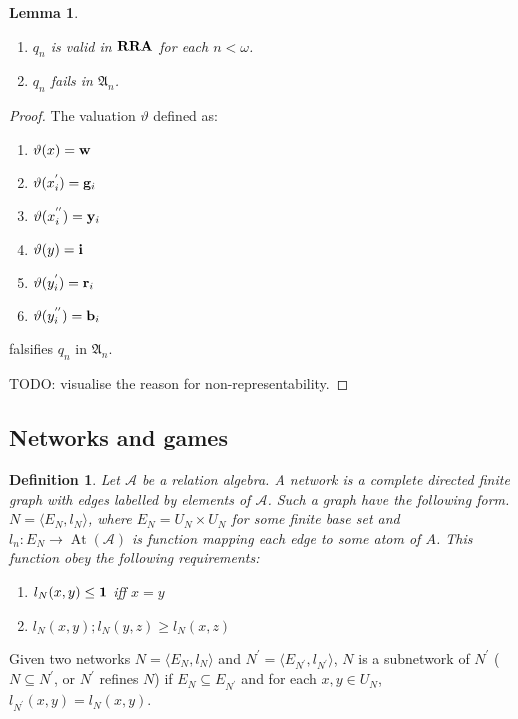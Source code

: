 \documentclass[a4paper]{article}
\theoremstyle{defin}
\newtheorem{defin}{Definition}
\theoremstyle{theorem}
\theoremstyle{prop}
\theoremstyle{lemma}
\newtheorem{lemma}{Lemma}
\theoremstyle{ex}
\theoremstyle{col}
\theoremstyle{claim}
\begin{document}
\begin{lemma}

  \begin{enumerate}
    \item $q_n$ is valid in ${\bf RRA}$ for each $n < \omega$.
    \item $q_n$ fails in $\mathfrak{A}_n$.
  \end{enumerate}
\end{lemma}

\begin{proof}
  The valuation $\vartheta$ defined as:
  \begin{enumerate}
    \item $\vartheta(x) = {\bf w}$
    \item $\vartheta(x_i^{'}) = {\bf g}_i$
    \item $\vartheta(x_i^{''}) = {\bf y}_i$
    \item $\vartheta(y) = {\bf i}$
    \item $\vartheta(y_i^{'}) = {\bf r}_i$
    \item $\vartheta(y_i^{''}) = {\bf b}_i$
  \end{enumerate}
  falsifies $q_n$ in $\mathfrak{A}_n$.

  TODO: visualise the reason for non-representability.
\end{proof}

\subsection{Networks and games}

\begin{defin}
  Let $\mathcal{A}$ be a relation algebra. A network is a complete directed finite graph with edges labelled by elements of $\mathcal{A}$. Such a graph have the following form. $N = \langle E_N, l_N \rangle$, where $E_N = U_N \times U_N$ for some finite base set and $l_n : E_N \to \operatorname{At}(\mathcal{A})$ is function mapping each edge to some atom of $A$. This function obey the following requirements:
  \begin{enumerate}
    \item $l_N(x,y) \leq {\bf 1}$ iff $x = y$
    \item $l_N(x, y) ; l_N(y,z) \geq l_N(x,z)$
  \end{enumerate}
\end{defin}
Given two networks $N = \langle E_N, l_N \rangle$ and $N^{'} = \langle E_{N^{'}}, l_{N^{'}} \rangle$, $N$ is a subnetwork of $N^{'}$ ($N \subseteq N^{'}$, or $N^{'}$ refines $N$) if $E_N \subseteq E_{N^{'}}$ and for each $x,y \in U_N$, $l_{N^{'}}(x,y) = l_{N}(x,y)$.
\end{document}

